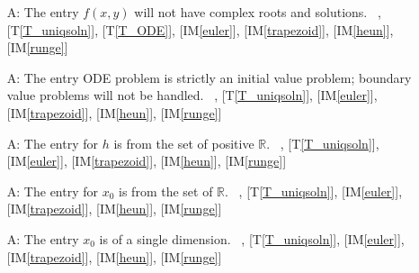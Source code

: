 \documentclass[12pt]{article}
\newcommand{\tref}[1]{T\ref{#1}}
\newcounter{assumpnum} %
\newcommand{\iref}[1]{IM\ref{#1}}
\begin{document}
\begin{itemize}
\item[A\refstepcounter{assumpnum}\theassumpnum \label{A_roots}:]
The entry $f(x, y)$ will not have complex roots and solutions.
~\newline
[\tref{T_ODE}], [\tref{T_uniqsoln}],
[\tref{T_ODE}], [\iref{euler}], [\iref{trapezoid}], [\iref{heun}], [\iref{runge}]

\item[A\refstepcounter{assumpnum}\theassumpnum \label{A_boundary}:]
The entry ODE problem is strictly an initial value problem; boundary value problems will
not be handled.
~\newline
[\tref{T_ODE}], [\tref{T_uniqsoln}],
[\iref{euler}], [\iref{trapezoid}], [\iref{heun}], [\iref{runge}]




\item[A\refstepcounter{assumpnum}\theassumpnum \label{A_entriesofh}:]
The entry for $h$ is from the set of positive $\mathbb{R}$.
~\newline
[\tref{T_ODE}], [\tref{T_uniqsoln}],
[\iref{euler}], [\iref{trapezoid}], [\iref{heun}], [\iref{runge}]

\item[A\refstepcounter{assumpnum}\theassumpnum \label{A_entriesofx0}:]
The entry for $x_0$ is from the set of $\mathbb{R}$.
~\newline
[\tref{T_ODE}], [\tref{T_uniqsoln}],
[\iref{euler}], [\iref{trapezoid}], [\iref{heun}], [\iref{runge}]

\item[A\refstepcounter{assumpnum}\theassumpnum \label{A_dimofx0}:]
The entry $x_0$ is of a single dimension.
~\newline
[\tref{T_ODE}], [\tref{T_uniqsoln}],
[\iref{euler}], [\iref{trapezoid}], [\iref{heun}], [\iref{runge}]


\end{itemize}
\end{document}

